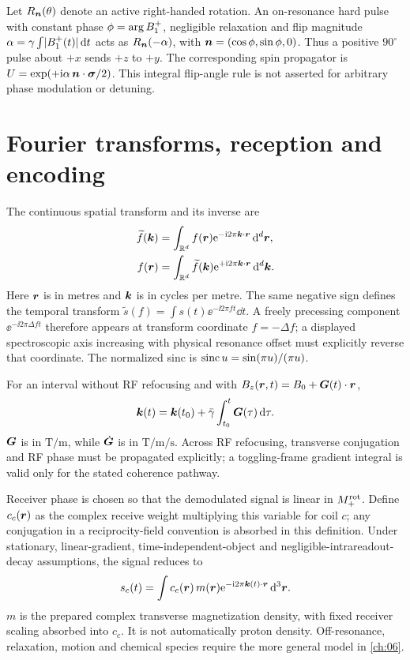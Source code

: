 Let $R_{\bm{n}}(\theta)$ denote an active right-handed rotation.
An on-resonance hard pulse with constant phase
$\phi=\arg B_{1}^{+}$, negligible relaxation and flip magnitude
$\alpha=\gamma\int\lvert B_{1}^{+}(t)\rvert\mathop{}\!\mathrm{d} t$ acts as
$R_{\bm{n}}(-\alpha)$, with
$\bm{n}=(\cos\phi,\sin\phi,0)$.
Thus a positive $90^\circ$ pulse about $+x$ sends $+z$ to $+y$.
The corresponding spin propagator is
$U=\exp(+\mathrm{i}\alpha\,\bm{n}\cdot\bm{\sigma}/2)$.
This integral flip-angle rule is not asserted for arbitrary phase
modulation or detuning.

\section*{Fourier transforms, reception and encoding}
The continuous spatial transform and its inverse are
\begin{align}
 \widetilde f(\bm{k})
 &=\int_{\mathbb R^d}f(\bm{r})
       \mathrm{e}^{-\mathrm{i}2\pi\bm{k}\cdot\bm{r}}\mathop{}\!\mathrm{d}^d\bm{r},
 \label{eq:convention:fourier-forward}\\
 f(\bm{r})
 &=\int_{\mathbb R^d}\widetilde f(\bm{k})
       \mathrm{e}^{+\mathrm{i}2\pi\bm{k}\cdot\bm{r}}\mathop{}\!\mathrm{d}^d\bm{k}.
 \label{eq:convention:fourier-inverse}
\end{align}
Here $\bm{r}$ is in metres and $\bm{k}$ is in cycles per metre.
The same negative sign defines the temporal transform
$\widetilde s(f)=\int s(t)\ee^{-\ii2\pi ft}\dd t$.
A freely precessing component $\ee^{-\ii2\pi\Delta f t}$ therefore
appears at transform coordinate $f=-\Delta f$; a displayed spectroscopic
axis increasing with physical resonance offset must explicitly reverse
that coordinate. The normalized sinc is
$\operatorname{sinc} u=\sin(\pi u)/(\pi u)$.

For an interval without RF refocusing and with
$B_z(\bm{r},t)=B_0+\bm{G}(t)\cdot\bm{r}$,
\begin{equation}
 \bm{k}(t)=\bm{k}(t_0)+\bar{\gamma}\int_{t_0}^{t}\bm{G}(\tau)\mathop{}\!\mathrm{d}\tau .
 \label{eq:convention:kspace}
\end{equation}
$\bm{G}$ is in $\si{\tesla\per\metre}$, while
$\dot{\bm{G}}$ is in $\si{\tesla\per\metre\per\second}$.
Across RF refocusing, transverse conjugation and RF phase must be
propagated explicitly; a toggling-frame gradient integral is valid only
for the stated coherence pathway.

Receiver phase is chosen so that the demodulated signal is linear in
$M_{+}^{\mathrm{rot}}$. Define $c_c(\bm{r})$ as the complex receive
weight multiplying this variable for coil $c$; any conjugation in a
reciprocity-field convention is absorbed in this definition.
Under stationary, linear-gradient, time-independent-object and
negligible-intrareadout-decay assumptions, the signal reduces to
\begin{equation}
 s_c(t)=\int c_c(\bm{r})\,m(\bm{r})
       \mathrm{e}^{-\mathrm{i}2\pi\bm{k}(t)\cdot\bm{r}}\mathop{}\!\mathrm{d}^3\bm{r} .
 \label{eq:convention:ideal-signal}
\end{equation}
$m$ is the prepared complex transverse magnetization density, with
fixed receiver scaling absorbed into $c_c$. It is not automatically
proton density. Off-resonance, relaxation, motion and chemical species
require the more general model in \cref{ch:06}.

